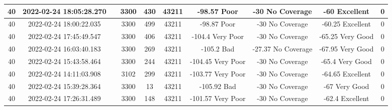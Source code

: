 \begin{longtable*}{|c|c|c|c|c|c|c|c|c|c|}
40&2022-02-24 18:05:28.270&&3300&430&43211& -98.57    Poor        & -30       No Coverage & -60       Excellent   & 0\\\hline
{}40&2022-02-24 18:00:22.035&&3300&499&43211& -98.87    Poor        & -30       No Coverage & -60.25    Excellent   & 0\\\hline
{}40&2022-02-24 17:45:49.547&&3300&406&43211& -104.4    Very Poor   & -30       No Coverage & -65.25    Very Good   & 0\\\hline
{}40&2022-02-24 16:03:40.183&&3300&269&43211& -105.2    Bad         & -27.37    No Coverage & -67.95    Very Good   & 0\\\hline
{}40&2022-02-24 15:43:58.464&&3300&244&43211& -104.45   Very Poor   & -30       No Coverage & -65.4     Very Good   & 0\\\hline
{}40&2022-02-24 14:11:03.908&&3102&299&43211& -103.77   Very Poor   & -30       No Coverage & -64.65    Excellent   & 0\\\hline
{}40&2022-02-24 15:39:28.364&&3300&13&43211& -105.92   Bad         & -30       No Coverage & -67       Very Good   & 0\\\hline
{}40&2022-02-24 17:26:31.489&&3300&148&43211& -101.57   Very Poor   & -30       No Coverage & -62.4     Excellent   & 0\\\hline

\end{longtable*}
